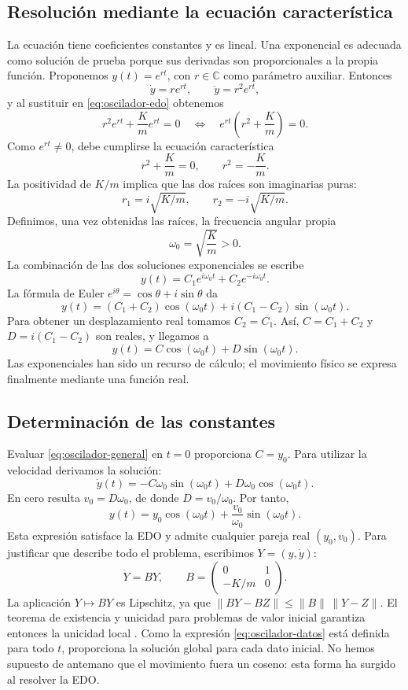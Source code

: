 \subsection{Resolución mediante la ecuación característica}
La ecuación tiene coeficientes constantes y es lineal. Una exponencial
es adecuada como solución de prueba porque sus derivadas son proporcionales
a la propia función. Proponemos $y(t)=e^{rt}$,
con $r\in\mathbb C$ como parámetro auxiliar. Entonces
\[
\dot y=re^{rt},\qquad \ddot y=r^2e^{rt},
\]
y al sustituir en \eqref{eq:oscilador-edo} obtenemos
\[
r^2e^{rt}+\frac Km e^{rt}=0
\quad\Longleftrightarrow\quad
 e^{rt}\left(r^2+\frac Km\right)=0.
\]
Como $e^{rt}\ne0$, debe cumplirse la ecuación característica
\[
r^2+\frac Km=0,\qquad r^2=-\frac Km.
\]
La positividad de $K/m$ implica que las dos raíces son imaginarias puras:
\[
r_1=i\sqrt{K/m},\qquad r_2=-i\sqrt{K/m}.
\]
Definimos, una vez obtenidas las raíces, la frecuencia angular propia
\begin{equation}
\omega_0=\sqrt{\frac Km}>0.
\label{eq:omega-oscilador}
\end{equation}
La combinación de las dos soluciones exponenciales se escribe
\[
y(t)=C_1e^{i\omega_0t}+C_2e^{-i\omega_0t}.
\]
La fórmula de Euler $e^{i\theta}=\cos\theta+i\sin\theta$ da
\[
y(t)=(C_1+C_2)\cos(\omega_0t)
+i(C_1-C_2)\sin(\omega_0t).
\]
Para obtener un desplazamiento real tomamos $C_2=\overline{C_1}$. Así,
$C=C_1+C_2$ y $D=i(C_1-C_2)$ son reales, y llegamos a
\begin{equation}
y(t)=C\cos(\omega_0t)+D\sin(\omega_0t).
\label{eq:oscilador-general}
\end{equation}
Las exponenciales han sido un recurso de cálculo; el movimiento físico
se expresa finalmente mediante una función real.

\subsection{Determinación de las constantes}
Evaluar \eqref{eq:oscilador-general} en $t=0$ proporciona $C=y_0$.
Para utilizar la velocidad derivamos la solución:
\[
\dot y(t)=-C\omega_0\sin(\omega_0t)+D\omega_0\cos(\omega_0t).
\]
En cero resulta $v_0=D\omega_0$, de donde $D=v_0/\omega_0$. Por tanto,
\begin{equation}
y(t)=y_0\cos(\omega_0t)+\frac{v_0}{\omega_0}\sin(\omega_0t).
\label{eq:oscilador-datos}
\end{equation}
Esta expresión satisface la EDO y admite cualquier pareja real $(y_0,v_0)$.
Para justificar que describe todo el problema, escribimos $Y=(y,\dot y)$:
\[
\dot Y=B Y,\qquad B=\begin{pmatrix}0&1\\-K/m&0\end{pmatrix}.
\]
La aplicación $Y\mapsto BY$ es Lipschitz, ya que
$\|BY-BZ\|\le\|B\|\,\|Y-Z\|$. El teorema de existencia y unicidad para
problemas de valor inicial garantiza entonces la unicidad local
\cite[\S2.2, teorema 2.2]{TeschlNotas}. Como la expresión
\eqref{eq:oscilador-datos} está definida para todo $t$, proporciona la
solución global para cada dato inicial. No hemos supuesto de antemano
que el movimiento fuera un coseno: esta forma ha surgido al resolver la EDO.

